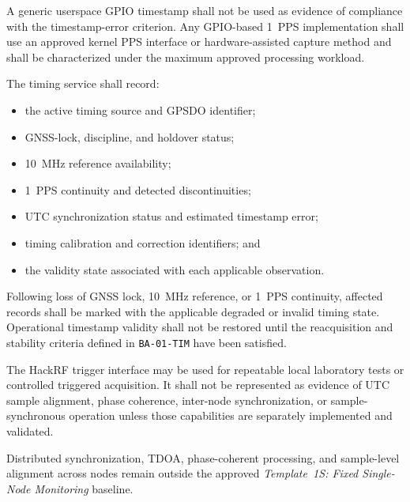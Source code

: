 \documentclass[11pt,a4paper]{article}
\begin{document}
	A generic userspace GPIO timestamp shall not be used as evidence of compliance
	with the timestamp-error criterion. Any GPIO-based 1~PPS implementation shall
	use an approved kernel PPS interface or hardware-assisted capture method and
	shall be characterized under the maximum approved processing workload.
	
	The timing service shall record:
	
	\begin{itemize}[leftmargin=*]
		\item the active timing source and GPSDO identifier;
		\item GNSS-lock, discipline, and holdover status;
		\item 10~MHz reference availability;
		\item 1~PPS continuity and detected discontinuities;
		\item UTC synchronization status and estimated timestamp error;
		\item timing calibration and correction identifiers; and
		\item the validity state associated with each applicable observation.
	\end{itemize}
	
	Following loss of GNSS lock, 10~MHz reference, or 1~PPS continuity, affected
	records shall be marked with the applicable degraded or invalid timing state.
	Operational timestamp validity shall not be restored until the reacquisition
	and stability criteria defined in \texttt{BA-01-TIM} have been satisfied.
	
	The HackRF trigger interface may be used for repeatable local laboratory tests
	or controlled triggered acquisition. It shall not be represented as evidence
	of UTC sample alignment, phase coherence, inter-node synchronization, or
	sample-synchronous operation unless those capabilities are separately
	implemented and validated.
	
	Distributed synchronization, TDOA, phase-coherent processing, and sample-level
	alignment across nodes remain outside the approved
	\emph{Template~1S: Fixed Single-Node Monitoring} baseline.
	
\end{document}
